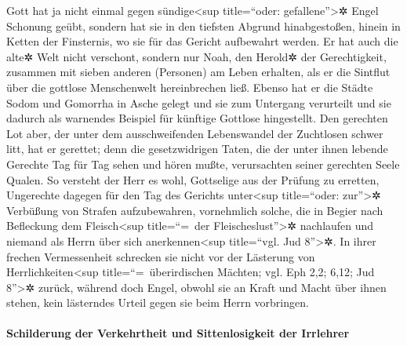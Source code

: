  Gott hat ja nicht einmal gegen sündige\textless sup
title=``oder: gefallene''\textgreater✲ Engel Schonung geübt, sondern hat
sie in den tiefsten Abgrund hinabgestoßen, hinein in Ketten der
Finsternis, wo sie für das Gericht aufbewahrt werden.  Er
hat auch die alte✲ Welt nicht verschont, sondern nur Noah, den Herold✲
der Gerechtigkeit, zusammen mit sieben anderen (Personen) am Leben
erhalten, als er die Sintflut über die gottlose Menschenwelt
hereinbrechen ließ.  Ebenso hat er die Städte Sodom und
Gomorrha in Asche gelegt und sie zum Untergang verurteilt und sie
dadurch als warnendes Beispiel für künftige Gottlose hingestellt.
 Den gerechten Lot aber, der unter dem ausschweifenden
Lebenswandel der Zuchtlosen schwer litt, hat er gerettet; 
denn die gesetzwidrigen Taten, die der unter ihnen lebende Gerechte Tag
für Tag sehen und hören mußte, verursachten seiner gerechten Seele
Qualen.  So versteht der Herr es wohl, Gottselige aus der
Prüfung zu erretten, Ungerechte dagegen für den Tag des Gerichts
unter\textless sup title=``oder: zur''\textgreater✲ Verbüßung von
Strafen aufzubewahren,  vornehmlich solche, die in Begier
nach Befleckung dem Fleisch\textless sup title=``=~der
Fleischeslust''\textgreater✲ nachlaufen und niemand als Herrn über sich
anerkennen\textless sup title=``vgl. Jud 8''\textgreater✲. In ihrer
frechen Vermessenheit schrecken sie nicht vor der Lästerung von
Herrlichkeiten\textless sup title=``=~überirdischen Mächten; vgl. Eph
2,2; 6,12; Jud 8''\textgreater✲ zurück,  während doch
Engel, obwohl sie an Kraft und Macht über ihnen stehen, kein lästerndes
Urteil gegen sie beim Herrn vorbringen.

\hypertarget{schilderung-der-verkehrtheit-und-sittenlosigkeit-der-irrlehrer}{%
\paragraph{Schilderung der Verkehrtheit und Sittenlosigkeit der
Irrlehrer}\label{schilderung-der-verkehrtheit-und-sittenlosigkeit-der-irrlehrer}}

